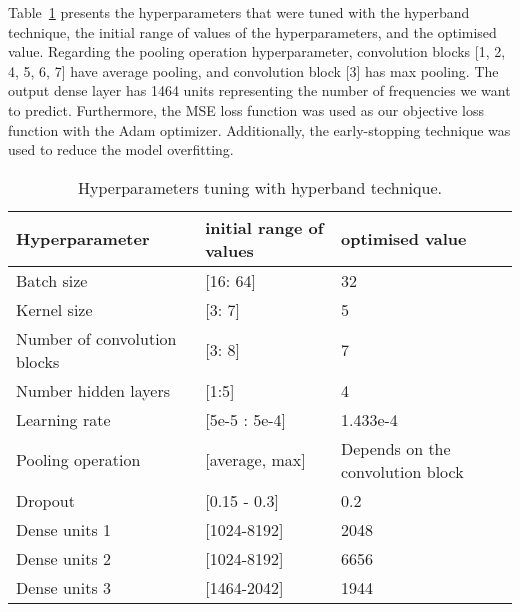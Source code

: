 Table~\ref{tab:hyperparemeter_tuning} presents the hyperparameters that were tuned with the hyperband technique, the initial range of values of the hyperparameters, and the optimised value.
Regarding the pooling operation hyperparameter, convolution blocks [1, 2, 4, 5, 6, 7] have average pooling, and convolution block [3] has max pooling.
The output dense layer has 1464 units representing the number of frequencies we want to predict.
Furthermore, the MSE loss function was used as our objective loss function with the Adam optimizer.
Additionally, the early-stopping technique was used to reduce the model overfitting. 
\begin{table}[] 
	\caption{Hyperparameters tuning with hyperband technique.}
	\begin{tabular}{lll}
		\toprule[1.5pt]
		Hyperparameter   & initial range of values & optimised value \\
		\midrule
		Batch size   & {[}16: 64{]}    & 32  \\		
		Kernel size  & {[}3: 7{]}  & 5   \\
		Number of convolution  blocks & {[}3: 8{]}  &  7\\
		Number hidden layers & {[}1:5{]}   & 4\\
		Learning rate    & {[}5e-5 : 5e-4{]}   & 1.433e-4\\
		Pooling operation    & {[}average, max{]}  & Depends on the convolution block \\
		Dropout  & {[}0.15 - 0.3{]}    & 0.2\\
		Dense units 1    & {[}1024-8192{]} & 2048\\
		Dense units 2    & {[}1024-8192{]} & 6656\\
		Dense units 3    & {[}1464-2042{]} & 1944\\
		\bottomrule[1.5pt]  
	\end{tabular}
	\label{tab:hyperparemeter_tuning}
\end{table}

